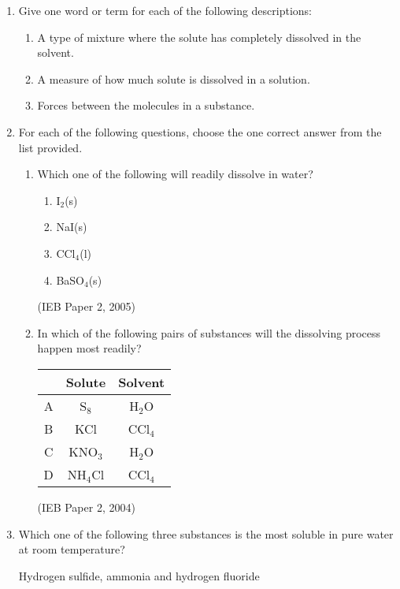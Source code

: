\begin{eocexercises}{}

\begin{enumerate}
\item{Give one word or term for each of the following descriptions:}
	\begin{enumerate}
	\item{A type of mixture where the solute has completely dissolved in the solvent.}
	\item{A measure of how much solute is dissolved in a solution.}
	\item{Forces between the molecules in a substance.}
	\end{enumerate}

\item{For each of the following questions, choose the one correct answer from the list provided.}
\renewcommand{\labelenumii}{\Alph{enumii}}

	\begin{enumerate}
	\item{Which one of the following will readily dissolve in water?}
		\begin{enumerate}
		\item{I$_{2}$(s)}
		\item{NaI(s)}
		\item{CCl$_{4}$(l)}
		\item{BaSO$_{4}$(s)}
		\end{enumerate}

(IEB Paper 2, 2005)
\renewcommand{\labelenumii}{\alph{enumii}}
	
	\item{In which of the following pairs of substances will the dissolving process happen most readily?\\}
		
\begin{tabular}{|c|c|c|}\hline
 & \textbf{Solute} & \textbf{Solvent} \\\hline
A & S$_{8}$ & H$_{2}$O \\\hline
B & KCl & CCl$_{4}$ \\\hline
C & KNO$_{3}$ & H$_{2}$O \\\hline
D & NH$_{4}$Cl & CCl$_{4}$ \\\hline 
\end{tabular}

(IEB Paper 2, 2004) 

	\end{enumerate}

\item{Which one of the following three substances is the most soluble in pure water at room temperature?}
	\begin{center}
	Hydrogen sulfide, ammonia and hydrogen fluoride
	\end{center}


\end{enumerate}
\end{eocexercises}
